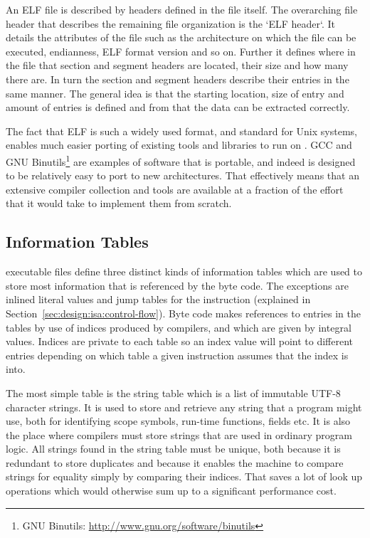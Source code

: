 An ELF file is described by headers defined in the file itself. The overarching
file header that describes the remaining file organization is the `ELF
header`. It details the attributes of the file such as the architecture on which
the file can be executed, endianness, ELF format version and so on. Further it
defines where in the file that section and segment headers are located, their
size and how many there are. In turn the section and segment headers describe
their entries in the same manner. The general idea is that the starting
location, size of entry and amount of entries is defined and from that the data
can be extracted correctly.

The fact that ELF is such a widely used format, and standard for Unix systems,
enables much easier porting of existing tools and libraries to run on
\thename{}. GCC and GNU Binutils\footnote{GNU Binutils:
  \url{http://www.gnu.org/software/binutils}} are examples of software that is
portable, and indeed is designed to be relatively easy to port to new
architectures. That effectively means that an extensive compiler collection and
tools are available at a fraction of the effort that it would take to implement
them from scratch.

\subsection{Information Tables}

\thename{} executable files define three distinct kinds of information tables
which are used to store most information that is referenced by the byte
code. The exceptions are inlined literal values and jump tables for the
 instruction (explained in
Section~\ref{sec:design:isa:control-flow}). Byte code makes references to
entries in the tables by use of indices produced by compilers, and which are
given by integral values. Indices are private to each table so an index value
will point to different entries depending on which table a given instruction
assumes that the index is into.

The most simple table is the string table which is a list of immutable UTF-8
character strings. It is used to store and retrieve any string that a program
might use, both for identifying scope symbols, run-time functions, fields
etc. It is also the place where compilers must store strings that are used in
ordinary program logic. All strings found in the string table must be unique,
both because it is redundant to store duplicates and because it enables the
machine to compare strings for equality simply by comparing their indices. That
saves a lot of look up operations which would otherwise sum up to a significant
performance cost.

